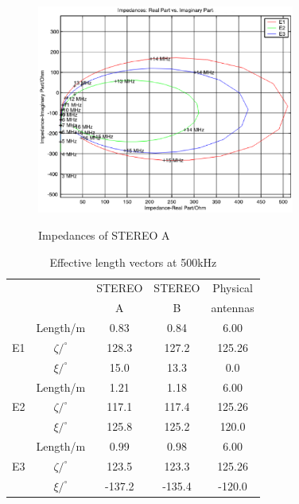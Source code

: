 \documentclass[galley,ras]{agu2001}
\begin{document}
\begin{article}
\begin{figure}
\noindent \includegraphics[width=20pc]{ImpedancesD22_caps.eps} \\ \caption{Impedances of STEREO A} \label{fig_Impedance2_D2_caps}
\end{figure}




\begin{table}  \label{tab_heff}
\caption{Effective length vectors at 500kHz}
\begin{flushleft}

\begin{tabular}{c|c|ccc}
\hline
&  & STEREO  & STEREO  & Physical  \\
& & A & B & antennas\\
\hline
 &Length/m& 0.83 &0.84&6.00\\
E1 & $\zeta/^\circ$ &128.3 & 127.2&125.26\\
 & $\xi/^\circ$ & 15.0& 13.3& 0.0\\
\hline
 &Length/m& 1.21 &1.18&6.00\\
E2 & $\zeta/^\circ$ &117.1 & 117.4&125.26\\
 & $\xi/^\circ$ & 125.8& 125.2& 120.0\\
\hline
 &Length/m& 0.99 &0.98&6.00\\
E3 & $\zeta/^\circ$ &123.5 & 123.3&125.26\\
 & $\xi/^\circ$ & -137.2& -135.4& -120.0\\
\hline
\end{tabular}
\end{flushleft}
\end{table}
%



\end{article}
\end{document}
